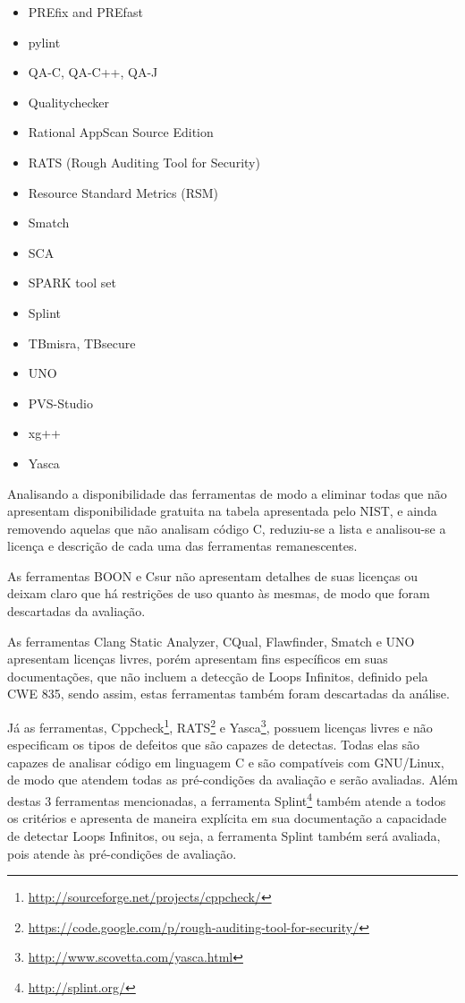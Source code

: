 \begin{itemize}
  \item PREfix and PREfast
  \item pylint
  \item QA-C, QA-C++, QA-J
  \item Qualitychecker
  \item Rational AppScan Source Edition
  \item RATS (Rough Auditing Tool for Security)
  \item Resource Standard Metrics (RSM)
  \item Smatch
  \item SCA
  \item SPARK tool set
  \item Splint
  \item TBmisra\textsuperscript{\textregistered}, TBsecure\textsuperscript{\textregistered}
  \item UNO
  \item PVS-Studio
  \item xg++
  \item Yasca
\end{itemize}

Analisando a disponibilidade das ferramentas de modo a eliminar todas que não apresentam disponibilidade gratuita na tabela apresentada pelo NIST, e ainda removendo aquelas que não analisam código C, reduziu-se a lista e analisou-se a licença e descrição de cada uma das ferramentas remanescentes.

As ferramentas BOON e Csur não apresentam detalhes de suas licenças ou deixam claro que há restrições de uso quanto às mesmas, de modo que foram descartadas da avaliação.

As ferramentas Clang Static Analyzer, CQual, Flawfinder, Smatch e UNO apresentam licenças livres, porém apresentam fins específicos em suas documentações, que não incluem a detecção de Loops Infinitos, definido pela CWE 835, sendo assim, estas ferramentas também foram descartadas da análise.

Já as ferramentas, Cppcheck\footnote{\url{http://sourceforge.net/projects/cppcheck/}}, RATS\footnote{\url{https://code.google.com/p/rough-auditing-tool-for-security/}} e Yasca\footnote{\url{http://www.scovetta.com/yasca.html}}, possuem licenças livres e não especificam os tipos de defeitos que são capazes de detectas. Todas elas são capazes de analisar código em linguagem C e são compatíveis com GNU/Linux, de modo que atendem todas as pré-condições da avaliação e serão avaliadas. Além destas 3 ferramentas mencionadas, a ferramenta Splint\footnote{\url{http://splint.org/}} também atende a todos os critérios e apresenta de maneira explícita em sua documentação a capacidade de detectar Loops Infinitos, ou seja, a ferramenta Splint também será avaliada, pois atende às pré-condições de avaliação.

